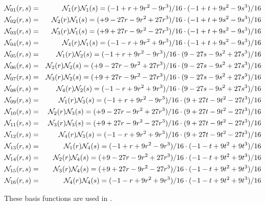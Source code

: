 \begin{mdframed}[backgroundcolor=blue!5]
\begin{eqnarray}
{\mathcal{N}}_{01}(r,s)&=&{\mathcal{N}}_1(r){\mathcal{N}}_1(s) = (-1   +r +9r^2 - 9r^3)/16 \cdot (-1  +t +9s^2 - 9s^3)/16 \nonumber\\
{\mathcal{N}}_{02}(r,s)&=&{\mathcal{N}}_2(r){\mathcal{N}}_1(s) = (+9 -27r -9r^2 +27r^3)/16 \cdot (-1  +t +9s^2 - 9s^3)/16 \nonumber\\
{\mathcal{N}}_{03}(r,s)&=&{\mathcal{N}}_3(r){\mathcal{N}}_1(s) = (+9 +27r -9r^2 -27r^3)/16 \cdot (-1  +t +9s^2 - 9s^3)/16 \nonumber\\
{\mathcal{N}}_{04}(r,s)&=&{\mathcal{N}}_4(r){\mathcal{N}}_1(s) = (-1   -r +9r^2 + 9r^3)/16 \cdot (-1  +t +9s^2 - 9s^3)/16 \nonumber\\
{\mathcal{N}}_{05}(r,s)&=&{\mathcal{N}}_1(r){\mathcal{N}}_2(s) = (-1   +r +9r^2 - 9r^3)/16 \cdot (9 -27s -9s^2 +27s^3)/16 \nonumber\\
{\mathcal{N}}_{06}(r,s)&=&{\mathcal{N}}_2(r){\mathcal{N}}_2(s) = (+9 -27r -9r^2 +27r^3)/16 \cdot (9 -27s -9s^2 +27s^3)/16 \nonumber\\
{\mathcal{N}}_{07}(r,s)&=&{\mathcal{N}}_3(r){\mathcal{N}}_2(s) = (+9 +27r -9r^2 -27r^3)/16 \cdot (9 -27s -9s^2 +27s^3)/16 \nonumber\\
{\mathcal{N}}_{08}(r,s)&=&{\mathcal{N}}_4(r){\mathcal{N}}_2(s) = (-1   -r +9r^2 + 9r^3)/16 \cdot (9 -27s -9s^2 +27s^3)/16 \nonumber\\
{\mathcal{N}}_{09}(r,s)&=&{\mathcal{N}}_1(r){\mathcal{N}}_3(s) = (-1   +r +9r^2 - 9r^3)/16 \cdot (9 +27t -9t^2 -27t^3)/16 \nonumber\\
{\mathcal{N}}_{10}(r,s)&=&{\mathcal{N}}_2(r){\mathcal{N}}_3(s) = (+9 -27r -9r^2 +27r^3)/16 \cdot (9 +27t -9t^2 -27t^3)/16 \nonumber\\
{\mathcal{N}}_{11}(r,s)&=&{\mathcal{N}}_3(r){\mathcal{N}}_3(s) = (+9 +27r -9r^2 -27r^3)/16 \cdot (9 +27t -9t^2 -27t^3)/16 \nonumber\\
{\mathcal{N}}_{12}(r,s)&=&{\mathcal{N}}_4(r){\mathcal{N}}_3(s) = (-1   -r +9r^2 + 9r^3)/16 \cdot (9 +27t -9t^2 -27t^3)/16 \nonumber\\
{\mathcal{N}}_{13}(r,s)&=&{\mathcal{N}}_1(r){\mathcal{N}}_4(s) = (-1   +r +9r^2 - 9r^3)/16 \cdot (-1   -t +9t^2 + 9t^3)/16\nonumber\\
{\mathcal{N}}_{14}(r,s)&=&{\mathcal{N}}_2(r){\mathcal{N}}_4(s) = (+9 -27r -9r^2 +27r^3)/16 \cdot (-1   -t +9t^2 + 9t^3)/16\nonumber\\
{\mathcal{N}}_{15}(r,s)&=&{\mathcal{N}}_3(r){\mathcal{N}}_4(s) = (+9 +27r -9r^2 -27r^3)/16 \cdot (-1   -t +9t^2 + 9t^3)/16\nonumber\\
{\mathcal{N}}_{16}(r,s)&=&{\mathcal{N}}_4(r){\mathcal{N}}_4(s) = (-1   -r +9r^2 + 9r^3)/16 \cdot (-1   -t +9t^2 + 9t^3)/16
\end{eqnarray}
\end{mdframed}


These basis functions are used in .



